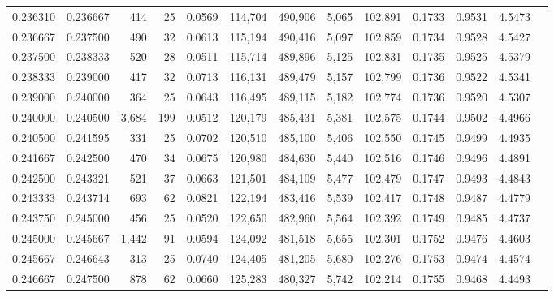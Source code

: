 \begin{tabular}{rrrrrrrrrrrrr}
0.236310 & 0.236667 &   414 &  25 &                                     0.0569 & 114,704 & 490,906 &   5,065 & 102,891 & 0.1733 & 0.9531 & 4.5473 \\
0.236667 & 0.237500 &   490 &  32 &                                     0.0613 & 115,194 & 490,416 &   5,097 & 102,859 & 0.1734 & 0.9528 & 4.5427 \\
0.237500 & 0.238333 &   520 &  28 &                                     0.0511 & 115,714 & 489,896 &   5,125 & 102,831 & 0.1735 & 0.9525 & 4.5379 \\
0.238333 & 0.239000 &   417 &  32 &                                     0.0713 & 116,131 & 489,479 &   5,157 & 102,799 & 0.1736 & 0.9522 & 4.5341 \\
0.239000 & 0.240000 &   364 &  25 &                                     0.0643 & 116,495 & 489,115 &   5,182 & 102,774 & 0.1736 & 0.9520 & 4.5307 \\
0.240000 & 0.240500 & 3,684 & 199 &                                     0.0512 & 120,179 & 485,431 &   5,381 & 102,575 & 0.1744 & 0.9502 & 4.4966 \\
0.240500 & 0.241595 &   331 &  25 &                                     0.0702 & 120,510 & 485,100 &   5,406 & 102,550 & 0.1745 & 0.9499 & 4.4935 \\
0.241667 & 0.242500 &   470 &  34 &                                     0.0675 & 120,980 & 484,630 &   5,440 & 102,516 & 0.1746 & 0.9496 & 4.4891 \\
0.242500 & 0.243321 &   521 &  37 &                                     0.0663 & 121,501 & 484,109 &   5,477 & 102,479 & 0.1747 & 0.9493 & 4.4843 \\
0.243333 & 0.243714 &   693 &  62 &                                     0.0821 & 122,194 & 483,416 &   5,539 & 102,417 & 0.1748 & 0.9487 & 4.4779 \\
0.243750 & 0.245000 &   456 &  25 &                                     0.0520 & 122,650 & 482,960 &   5,564 & 102,392 & 0.1749 & 0.9485 & 4.4737 \\
0.245000 & 0.245667 & 1,442 &  91 &                                     0.0594 & 124,092 & 481,518 &   5,655 & 102,301 & 0.1752 & 0.9476 & 4.4603 \\
0.245667 & 0.246643 &   313 &  25 &                                     0.0740 & 124,405 & 481,205 &   5,680 & 102,276 & 0.1753 & 0.9474 & 4.4574 \\
0.246667 & 0.247500 &   878 &  62 &                                     0.0660 & 125,283 & 480,327 &   5,742 & 102,214 & 0.1755 & 0.9468 & 4.4493 \\

\end{tabular}
